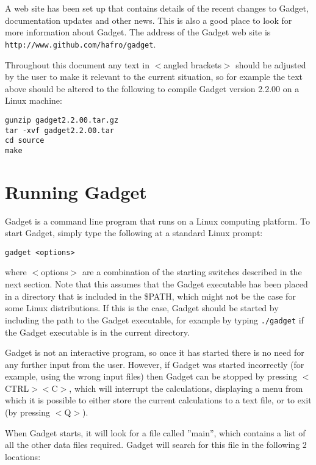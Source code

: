 \documentclass[10pt,twoside]{book}
\begin{document}
\bigskip A web site has been set up that contains details of the
recent changes to Gadget, documentation updates and other news.  This
is also a good place to look for more information about Gadget.  The
address of the Gadget web site is {\tt
  http://www.github.com/hafro/gadget}. 

\bigskip Throughout this document any text in $<$angled brackets$>$
should be adjusted by the user to make it relevant to the current
situation, so for example the text above should be altered to the
following to compile Gadget version 2.2.00 on a Linux machine:

{\small\begin{verbatim}
gunzip gadget2.2.00.tar.gz
tar -xvf gadget2.2.00.tar
cd source
make
\end{verbatim}}

\section{Running Gadget}\label{sec:runninggadget}
Gadget is a command line program that runs on a Linux computing platform.  To start Gadget, simply type the following at a standard Linux prompt:

{\small\begin{verbatim}
gadget <options>
\end{verbatim}}

where $<$options$>$ are a combination of the starting switches
described in the next section.  Note that this assumes that the Gadget
executable has been placed in a directory that is included in the
\$PATH, which might not be the case for some Linux distributions.  If
this is the case, Gadget should be started by including the path to
the Gadget executable, for example by typing {\small{\tt ./gadget}} if
the Gadget executable is in the current directory.

\bigskip Gadget is not an interactive program, so once it has started
there is no need for any further input from the user.  However, if
Gadget was started incorrectly (for example, using the wrong input
files) then Gadget can be stopped by pressing $<$CTRL$><$C$>$, which
will interrupt the calculations, displaying a menu from which it is
possible to either store the current calculations to a text file, or
to exit (by pressing $<$Q$>$).

\bigskip When Gadget starts, it will look for a file called ''main'',
which contains a list of all the other data files required.  Gadget
will search for this file in the following 2 locations:
\end{document}
